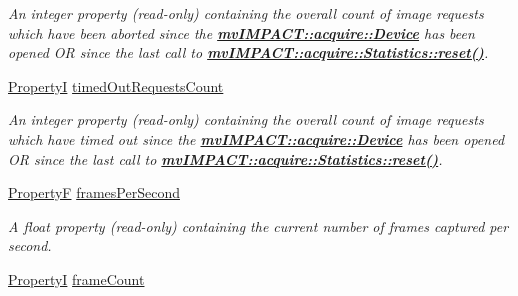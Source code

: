 \begin{DoxyCompactItemize}
\begin{DoxyCompactList}\small\item\em An integer property {\bfseries }(read-\/only) containing the overall count of image requests which have been aborted since the {\bfseries \hyperlink{classmv_i_m_p_a_c_t_1_1acquire_1_1_device}{mv\+I\+M\+P\+A\+C\+T\+::acquire\+::\+Device}} has been opened O\+R since the last call to {\bfseries \hyperlink{classmv_i_m_p_a_c_t_1_1acquire_1_1_statistics_adc21a9add6973f8f829f751e616b0a43}{mv\+I\+M\+P\+A\+C\+T\+::acquire\+::\+Statistics\+::reset()}}. \end{DoxyCompactList}\item 
\hypertarget{classmv_i_m_p_a_c_t_1_1acquire_1_1_statistics_ab8738bd52627e687745a8a5e8cfcf9a6}{\hyperlink{group___common_interface_ga12d5e434238ca242a1ba4c6c3ea45780}{Property\+I} \hyperlink{classmv_i_m_p_a_c_t_1_1acquire_1_1_statistics_ab8738bd52627e687745a8a5e8cfcf9a6}{timed\+Out\+Requests\+Count}}\label{classmv_i_m_p_a_c_t_1_1acquire_1_1_statistics_ab8738bd52627e687745a8a5e8cfcf9a6}

\begin{DoxyCompactList}\small\item\em An integer property {\bfseries }(read-\/only) containing the overall count of image requests which have timed out since the {\bfseries \hyperlink{classmv_i_m_p_a_c_t_1_1acquire_1_1_device}{mv\+I\+M\+P\+A\+C\+T\+::acquire\+::\+Device}} has been opened O\+R since the last call to {\bfseries \hyperlink{classmv_i_m_p_a_c_t_1_1acquire_1_1_statistics_adc21a9add6973f8f829f751e616b0a43}{mv\+I\+M\+P\+A\+C\+T\+::acquire\+::\+Statistics\+::reset()}}. \end{DoxyCompactList}\item 
\hypertarget{classmv_i_m_p_a_c_t_1_1acquire_1_1_statistics_a6f6a470085cfb55e2f2a973562344dec}{\hyperlink{group___common_interface_gaf54865fe5a3d5cfd15f9a111b40d09f9}{Property\+F} \hyperlink{classmv_i_m_p_a_c_t_1_1acquire_1_1_statistics_a6f6a470085cfb55e2f2a973562344dec}{frames\+Per\+Second}}\label{classmv_i_m_p_a_c_t_1_1acquire_1_1_statistics_a6f6a470085cfb55e2f2a973562344dec}

\begin{DoxyCompactList}\small\item\em A float property {\bfseries }(read-\/only) containing the current number of frames captured per second. \end{DoxyCompactList}\item 
\hypertarget{classmv_i_m_p_a_c_t_1_1acquire_1_1_statistics_a6b7121fa07c4e99b29c26473f3e6d229}{\hyperlink{group___common_interface_ga12d5e434238ca242a1ba4c6c3ea45780}{Property\+I} \hyperlink{classmv_i_m_p_a_c_t_1_1acquire_1_1_statistics_a6b7121fa07c4e99b29c26473f3e6d229}{frame\+Count}}\label{classmv_i_m_p_a_c_t_1_1acquire_1_1_statistics_a6b7121fa07c4e99b29c26473f3e6d229}


\end{DoxyCompactItemize}
